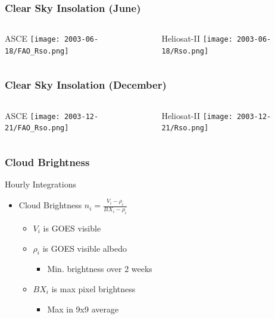 \documentclass{beamer}
\begin{document}
\begin{frame}
  \frametitle{Clear Sky Insolation (June)}
  \begin{columns}
    \begin{block}{ASCE}
      \texttt{[image: 2003-06-18/FAO\_Rso.png]}
    \end{block}
    \begin{block}{Heliosat-II}
      \texttt{[image: 2003-06-18/Rso.png]}
    \end{block}
  \end{columns}
\end{frame}

\begin{frame}
  \frametitle{Clear Sky Insolation (December)}
  \begin{columns}
    \begin{block}{ASCE}
      \texttt{[image: 2003-12-21/FAO\_Rso.png]}
    \end{block}
    \begin{block}{Heliosat-II}
      \texttt{[image: 2003-12-21/Rso.png]}
    \end{block}
  \end{columns}
\end{frame}

\begin{frame}
  \frametitle{Cloud Brightness}

   \begin{block}{Hourly Integrations}
   \begin{center}
     \resizebox{0.6\textwidth}{!}{}
   \end{center}
   \end{block}


   \begin{itemize}
     
   \item Cloud Brightness $n_i = \frac{V_i - \rho_i}{BX_i - \rho_i}$
     \begin{itemize}
     \item $V_i$ is \ac{GOES} visible
     \item $\rho_i$ is \ac{GOES} visible albedo
       \begin{itemize}
       \item Min. brightness over 2 weeks
       \end{itemize}
     \item $BX_i$ is max pixel brightness
       \begin{itemize}
       \item Max in 9x9 average
       \end{itemize}
     \end{itemize}
   \end{itemize}
\end{frame}
\end{document}
